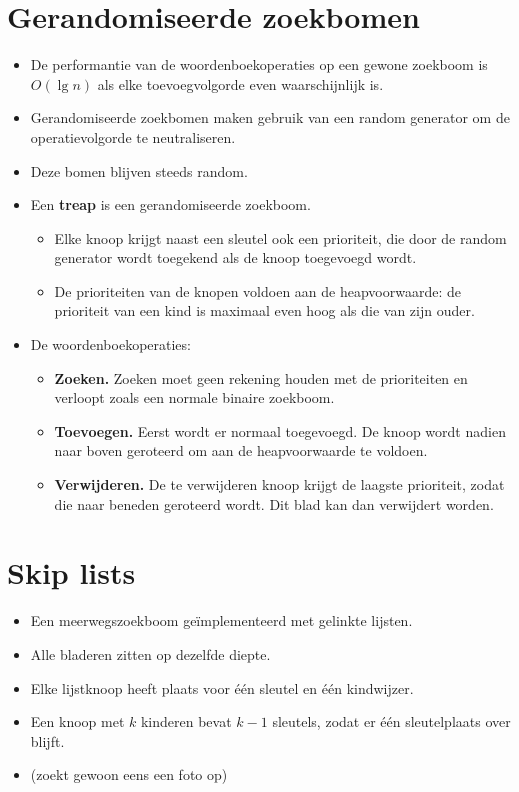 \section{Gerandomiseerde zoekbomen}
\label{sec:gerandomiseerde-zoekbomen}
\begin{itemize}
    \item De performantie van de woordenboekoperaties op een gewone zoekboom is $O(\lg n)$ als elke toevoegvolgorde even waarschijnlijk is.
    \item Gerandomiseerde zoekbomen maken gebruik van een random generator om de operatievolgorde te neutraliseren.
    \item Deze bomen blijven steeds random.
    \item Een \textbf{treap} is een gerandomiseerde zoekboom.
    \begin{itemize}
        \item Elke knoop krijgt naast een sleutel ook een prioriteit, die door de random generator wordt toegekend als de knoop toegevoegd wordt.
        \item De prioriteiten van de knopen voldoen aan de heapvoorwaarde: de prioriteit van een kind is maximaal even hoog als die van zijn ouder.
    \end{itemize}
    \item De woordenboekoperaties:
    \begin{itemize}
        \item \textbf{Zoeken.}  Zoeken moet geen rekening houden met de prioriteiten en verloopt zoals een normale binaire zoekboom.
        \item \textbf{Toevoegen.} Eerst wordt er normaal toegevoegd. De knoop wordt nadien naar boven geroteerd om aan de heapvoorwaarde te voldoen.
        \item \textbf{Verwijderen.} De te verwijderen knoop krijgt de laagste prioriteit, zodat die naar beneden geroteerd wordt. Dit blad kan dan verwijdert worden.
    \end{itemize}
\end{itemize}

\section{Skip lists}
\begin{itemize}
    \item Een meerwegszoekboom geïmplementeerd met gelinkte lijsten.
    \item Alle bladeren zitten op dezelfde diepte.
    \item Elke lijstknoop heeft plaats voor één sleutel en één kindwijzer.
    \item Een knoop met $k$ kinderen bevat $k-1$ sleutels, zodat er één sleutelplaats over blijft.
    \item (zoekt gewoon eens een foto op)
\end{itemize}